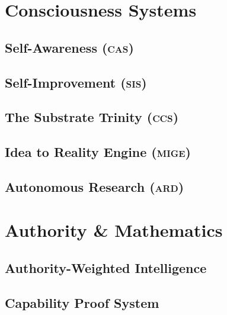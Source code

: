 \documentclass[11pt,a4paper,twoside]{book}
\newcommand{\cas}{\textsc{cas}}
\newcommand{\sis}{\textsc{sis}}
\newcommand{\ccs}{\textsc{ccs}}
\newcommand{\mige}{\textsc{mige}}
\newcommand{\ard}{\textsc{ard}}
\theoremstyle{definition}
\theoremstyle{remark}
\begin{document}
\part{Consciousness Systems}

\chapter{Self-Awareness (\cas)}
\label{ch:cas}


\chapter{Self-Improvement (\sis)}
\label{ch:sis}


\chapter{The Substrate Trinity (\ccs)}
\label{ch:ccs}


\chapter{Idea to Reality Engine (\mige)}
\label{ch:mige}


\chapter{Autonomous Research (\ard)}
\label{ch:ard}


\part{Authority \& Mathematics}

\chapter{Authority-Weighted Intelligence}
\label{ch:authority}


\chapter{Capability Proof System}
\label{ch:capability}

\end{document}
